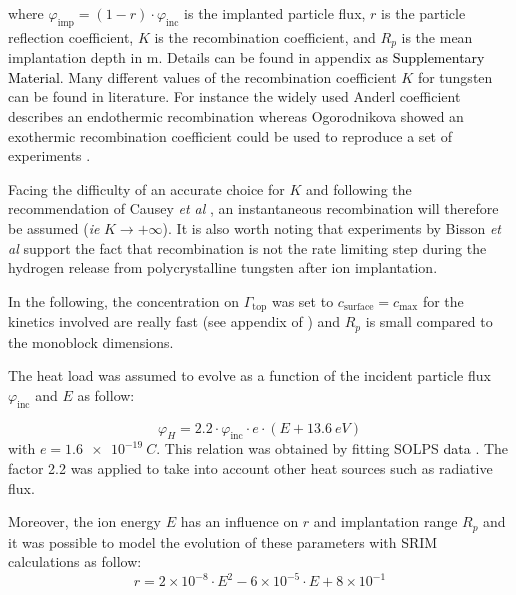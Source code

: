 where $\varphi_\mathrm{imp} = (1-r) \cdot \varphi_\mathrm{inc}$ is the implanted particle flux, $r$ is the particle reflection coefficient, $K$ is the recombination coefficient, and $R_p$ is the mean implantation depth in \si{m}.
Details can be found in appendix \textcolor{black}{as Supplementary Material}.
Many different values of the recombination coefficient $K$ for tungsten can be found in literature.
For instance the widely used Anderl coefficient describes an endothermic recombination \cite{anderl_hydrogen_1990} whereas Ogorodnikova showed an exothermic recombination coefficient could be used to reproduce a set of experiments \cite{ogorodnikova_recombination_2019}.

Facing the difficulty of an accurate choice for $K$ and following the recommendation of Causey \textit{et al} \cite{causey_hydrogen_2002}, an instantaneous recombination will therefore be assumed (\textit{ie} $K \rightarrow +\infty$).
It is also worth noting that experiments by Bisson \textit{et al} \cite{bisson_dynamic_2015} support the fact that recombination is not the rate limiting step during the hydrogen release from polycrystalline tungsten after ion implantation.

In the following, the concentration on $\Gamma_\mathrm{top}$ was set to $c_\mathrm{surface} = c_{\mathrm{max}}$ for the kinetics involved are really fast (see appendix of \cite{hodille_hydrogen_2018}) and $R_p$ is small compared to the monoblock dimensions.

The heat load was assumed to evolve as a function of the incident particle flux $\varphi_\mathrm{inc}$ and $E$ as follow:

\begin{equation}
    \varphi_H = 2.2\cdot \varphi_\mathrm{inc} \cdot e \cdot (E + \SI{13.6}{eV})
    \label{eq:phi_H}
\end{equation}
with $e = \SI{1.6e-19}{C}$.
This relation was obtained by fitting SOLPS \textcolor{black}{data \cite{pacher_impurity_2015, khan_walldyn_2019}}.
The factor 2.2 was applied to take into account other heat sources such as radiative flux.

Moreover, the ion energy $E$ has an influence on $r$ and implantation range $R_p$ and it was possible to model the evolution of these parameters with SRIM \cite{ziegler_srim_2010} calculations as follow:
\begin{equation}
    r = 2\times 10^{-8} \cdot E^2 -6 \times 10^{-5} \cdot E + 8\times 10^{-1}
    \label{eq:r}
\end{equation}

